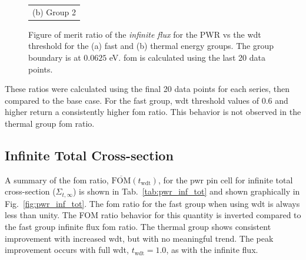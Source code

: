 \begin{figure}[hbtp]
\begin{tabular}{c}
    (b) Group 2
  \end{tabular}
  \caption[Figure of merit ratio of the \textit{infinite flux} for the
  PWR]{Figure of merit ratio of the \textit{infinite flux} for the PWR vs the
    \gls{wdt} threshold for the (a) fast and (b) thermal energy
    groups. The group boundary is at $0.0625$ eV. \gls{fom} is
    calculated using the last 20 data points.}
  \label{fig:pwr_inf_flx}
\end{figure}
%
These ratios were calculated using the final 20 data points for each
series, then compared to the base case. For the fast group, \gls{wdt} threshold values
of 0.6 and higher return a consistently higher \gls{fom} ratio. This
behavior is not observed in the thermal group \gls{fom} ratio.

\subsection{Infinite Total Cross-section}
\label{sec:pwr_inf_total}
A summary of the \gls{fom} ratio,
$\overline{\mathrm{FOM}}(t_{\mathrm{wdt}})$, for the \gls{pwr} pin
cell for infinite total cross-section ($\Sigma_{t,
  \infty}$) is shown in Tab.~\ref{tab:pwr_inf_tot} and shown
graphically in Fig.~\ref{fig:pwr_inf_tot}. The \gls{fom} ratio for the
fast group when using \gls{wdt} is always less than unity. The FOM ratio behavior for this quantity is inverted compared to the fast group infinite flux \gls{fom}
ratio. The thermal group shows consistent improvement with increased \gls{wdt}, but
with no meaningful trend. The peak improvement occurs with full
\gls{wdt}, $t_{\mathrm{wdt}} = 1.0$, as with the infinite flux.

